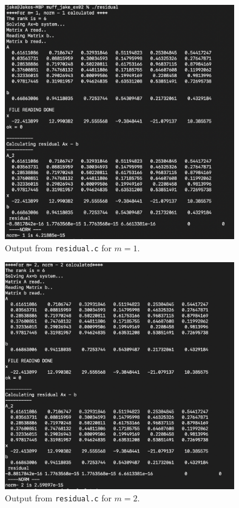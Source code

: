 \documentclass[12pt]{article}
\begin{document}
\begin{figure}
    
    \includegraphics[width=10cm]{norm1.png}
    \centering
    \caption{Output from \lstinline{residual.c} for $m=1$.}

\end{figure}

\begin{figure}
    
    \includegraphics[width=10cm]{norm2.png}
    \centering
    \caption{Output from \lstinline{residual.c} for $m=2$.}

\end{figure}
\end{document}
